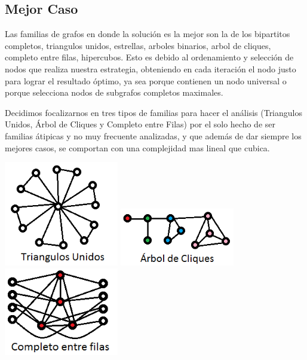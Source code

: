 \subsection{Mejor Caso}

Las familias de grafos en donde la solución es la mejor son la de los bipartitos completos, triangulos unidos, estrellas, arboles binarios, arbol de cliques, completo entre filas, hipercubos. Esto es debido al ordenamiento y selección de nodos que realiza nuestra estrategia, obteniendo en cada iteración el nodo justo para lograr el resultado óptimo, ya sea porque contienen un nodo universal o porque selecciona nodos de subgrafos completos maximales.

Decidimos focalizarnos en tres tipos de familias para hacer el análisis (Triangulos Unidos, Árbol de Cliques y Completo entre Filas) por el solo hecho de ser familias átipicas y no muy frecuente analizadas, y que además de dar siempre los mejores casos, se comportan con una complejidad mas lineal que cubica.

\includegraphics[width=5cm]{./graficos/triangulosunidos.png}
\includegraphics[width=5cm]{./graficos/cliquetree.png}
\includegraphics[width=5cm]{./graficos/completoentrefilas.png}

